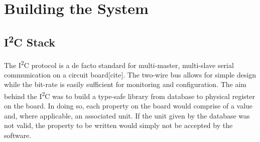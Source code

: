 \documentclass[a4paper,11pt,twocolumn]{article}
\begin{document}
	\section{Building the System} 
	\subsection{I\textsuperscript{2}C Stack} 
	The I\textsuperscript{2}C protocol is a de facto standard for multi-master, multi-slave serial communication on a circuit board[cite]. The two-wire bus allows for simple design while the bit-rate is easily sufficient for monitoring and configuration. The aim behind the I\textsuperscript{2}C was to build a type-safe library from database to physical register on the board. In doing so, each property on the board would comprise of a value and, where applicable, an associated unit. If the unit given by the database was not valid, the property to be written would simply not be accepted by the software. 
\end{document}
